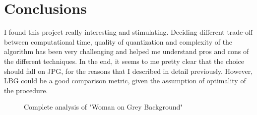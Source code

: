 \documentclass{report}
\begin{document}
\section{Conclusions}
I found this project really interesting and stimulating. Deciding different trade-off between computational time, quality of quantization and complexity of the algorithm has been very challenging and helped me understand pros and cons of the different techniques. In the end, it seems to me pretty clear that the choice should fall on JPG, for the reasons that I described in detail previously. However, LBG could be a good comparison metric, given the assumption of optimality of the procedure.

\begin{figure} 
	\centering
	\hfill
	\hfill
	\vfill
	\hfill
	\caption{Complete analysis of "Woman on Grey Background"}
	\label{fig:analysis_4}
\end{figure}
\end{document}
